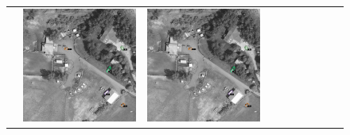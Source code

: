 \begin{figure}[h!]
\begin{tabularx}{\textwidth}{c|*{9}{X}}
    & \includegraphics[trim={730pt 220pt 200pt 720pt},clip,width=\linewidth]{images/015Results/03ablation/comp_images/green/523.png}
    & \includegraphics[trim={850pt 110pt 80pt 830pt},clip,width=\linewidth]{images/015Results/03ablation/comp_images/green/523.png}

\end{tabularx}
\end{figure}
